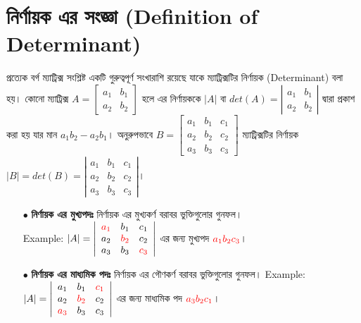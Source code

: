 \section{নির্ণায়ক এর সংজ্ঞা (Definition of Determinant)}
প্রত্যেক বর্গ ম্যাট্রিক্স সংশ্লিষ্ট একটি গুরুত্বপূর্ণ সংখারাশি রয়েছে যাকে ম্যাট্রিক্সটির নির্ণায়ক (Determinant) বলা হয়। কোনো ম্যাট্রিক্স 
$A=\left[\begin{array}{cc}
a_{1} & b_{1} \\
a_{2} & b_{2}
\end{array}\right]$ হলে এর নির্ণায়ককে $|A|$ বা $det(A)=\left|\begin{array}{cc}
a_{1} & b_{1} \\
a_{2} & b_{2}
\end{array}\right|$ দ্বারা প্রকাশ করা হয় যার মান $a_{1}b_{2}-a_{2}b_{1}$। অনুরুপভাবে 
$B=\left[\begin{array}{ccc}
a_{1} & b_{1} & c_{1} \\
a_{2} & b_{2} & c_{2} \\
a_{3} & b_{3} & c_{3}
\end{array}\right]$ ম্যাট্রিক্সটির নির্ণায়ক $|B|=det(B)=\left|\begin{array}{ccc}
a_{1} & b_{1} & c_{1} \\
a_{2} & b_{2} & c_{2} \\
a_{3} & b_{3} & c_{3}
\end{array}\right|$। 
\begin{tcolorbox}
	\begin{itemize}
		\item[$\bullet$] \textbf{নির্ণায়ক এর মুখ্যপদঃ} নির্ণায়ক এর মুখ্যকর্ণ বরাবর ভুক্তিগুলোর গুনফল।\\ Example: $|A|=\left|\begin{array}{ccc}
		\textcolor{red}{a_{1}} & b_{1} & c_{1} \\
		a_{2} & \textcolor{red}{b_{2}} & c_{2} \\
		a_{3} & b_{3} & \textcolor{red}{c_{3}}
		\end{array}\right|$ এর জন্য মুখ্যপদ  $\textcolor{red}{a_{1}b_{2}c_{3}}$।
		\item[$\bullet$] \textbf{নির্ণায়ক এর মাধ্যমিক পদঃ} নির্ণায়ক এর গৌণকর্ণ বরাবর ভুক্তিগুলোর গুনফল। Example: $|A|=\left|\begin{array}{ccc}
		a_{1} & b_{1} & \textcolor{red}{c_{1}} \\
		a_{2} & \textcolor{red}{b_{2}} & c_{2} \\
		\textcolor{red}{a_{3}} & b_{3} & c_{3}
		\end{array}\right|$ এর জন্য মাধ্যমিক পদ $\textcolor{red}{a_{3}b_{2}c_{1}}$। 
	\end{itemize}
\end{tcolorbox}
